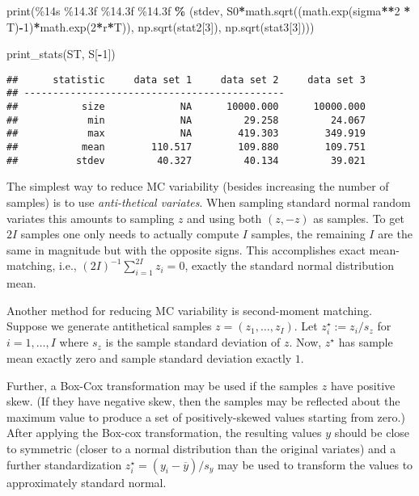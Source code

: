 \documentclass[
]{book}
\newenvironment{Shaded}{\begin{snugshade}}{\end{snugshade}}
\newcommand{\BuiltInTok}[1]{#1}
\newcommand{\DecValTok}[1]{\textcolor[rgb]{0.00,0.00,0.81}{#1}}
\newcommand{\NormalTok}[1]{#1}
\newcommand{\OperatorTok}[1]{\textcolor[rgb]{0.81,0.36,0.00}{\textbf{#1}}}
\newcommand{\SpecialCharTok}[1]{\textcolor[rgb]{0.00,0.00,0.00}{#1}}
\newcommand{\StringTok}[1]{\textcolor[rgb]{0.31,0.60,0.02}{#1}}
\begin{document}
\begin{Shaded}
\begin{Highlighting}[]
    \BuiltInTok{print}\NormalTok{(}\StringTok{\textquotesingle{}}\SpecialCharTok{\%14s}\StringTok{ }\SpecialCharTok{\%14.3f}\StringTok{ }\SpecialCharTok{\%14.3f}\StringTok{ }\SpecialCharTok{\%14.3f}\StringTok{\textquotesingle{}} \OperatorTok{\%}\NormalTok{ (}\StringTok{\textquotesingle{}stdev\textquotesingle{}}\NormalTok{, S0}\OperatorTok{*}\NormalTok{math.sqrt((math.exp(sigma}\OperatorTok{**}\DecValTok{2} \OperatorTok{*}\NormalTok{ T)}\OperatorTok{{-}}\DecValTok{1}\NormalTok{)}\OperatorTok{*}\NormalTok{math.exp(}\DecValTok{2}\OperatorTok{*}\NormalTok{r}\OperatorTok{*}\NormalTok{T)), np.sqrt(stat2[}\DecValTok{3}\NormalTok{]), np.sqrt(stat3[}\DecValTok{3}\NormalTok{])))}


\NormalTok{print\_stats(ST, S[}\OperatorTok{{-}}\DecValTok{1}\NormalTok{])}
\end{Highlighting}
\end{Shaded}

\begin{verbatim}
##      statistic     data set 1     data set 2     data set 3
## ---------------------------------------------
##           size             NA      10000.000      10000.000
##            min             NA         29.258         24.067
##            max             NA        419.303        349.919
##           mean        110.517        109.880        109.751
##          stdev         40.327         40.134         39.021
\end{verbatim}

The simplest way to reduce MC variability (besides increasing the number of samples) is to use \emph{anti-thetical variates}. When sampling standard normal random variates this amounts to sampling \(z\) and using both \((z,-z)\) as samples. To get \(2I\) samples one only needs to actually compute \(I\) samples, the remaining \(I\) are the same in magnitude but with the opposite signs. This accomplishes exact mean-matching, i.e., \((2I)^{-1}\sum_{i=1}^{2I} z_i = 0\), exactly the standard normal distribution mean.

Another method for reducing MC variability is second-moment matching. Suppose we generate antithetical samples \(z = (z_1, \ldots, z_I)\). Let \(z^\star_i := z_i / s_{z}\) for \(i=1, \ldots, I\) where \(s_z\) is the sample standard deviation of \(z\). Now, \(z^\star\) has sample mean exactly zero and sample standard deviation exactly \(1\).

Further, a Box-Cox transformation may be used if the samples \(z\) have positive skew. (If they have negative skew, then the samples may be reflected about the maximum value to produce a set of positively-skewed values starting from zero.) After applying the Box-cox transformation, the resulting values \(y\) should be close to symmetric (closer to a normal distribution than the original variates) and a further standardization \(z^\star_i = (y_i - \overline y)/s_y\) may be used to transform the values to approximately standard normal.
\end{document}
